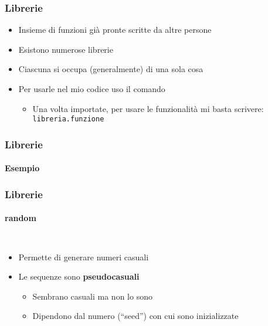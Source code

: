 
\begin{contentframe}
    \frametitle{Librerie}

    \begin{itemize}
        \item Insieme di funzioni già pronte scritte da altre persone
        \bigskip
        \item Esistono numerose librerie
        \item Ciascuna si occupa (generalmente) di una sola cosa
        \bigskip
        \item Per usarle nel mio codice uso il comando 
        \begin{itemize}
            \item Una volta importate, per usare le funzionalità mi basta scrivere:\\
            \texttt{libreria.funzione}
        \end{itemize}
    \end{itemize}
\end{contentframe}

\begin{exampleframe}
    \frametitle{Librerie}
    \framesubtitle{Esempio}

    \centering
\end{exampleframe}

\begin{contentframe}
    \frametitle{Librerie}
    \framesubtitle{random}

    \begin{columns}
        \begin{itemize}
            \item Permette di generare numeri casuali

            \bigskip
            \item Le sequenze sono \textbf{pseudocasuali}
            \begin{itemize}
                \item Sembrano casuali ma non lo sono
                \item Dipendono dal numero (``seed'') con cui sono inizializzate
            \end{itemize}
        \end{itemize}
        
        \centering
    \end{columns}
\end{contentframe}


